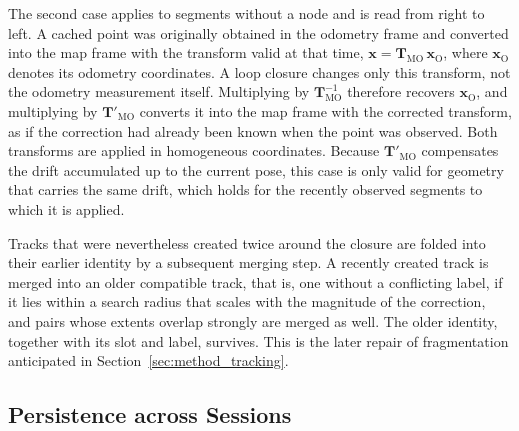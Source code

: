 {The second case applies to segments without a node and is read from right to left. A cached point was originally obtained in the odometry frame and converted into the map frame with the transform valid at that time, $\mathbf{x} = \mathbf{T}_{\mathrm{MO}}\,\mathbf{x}_{\mathrm{O}}$, where $\mathbf{x}_{\mathrm{O}}$ denotes its odometry coordinates. A loop closure changes only this transform, not the odometry measurement itself. Multiplying by $\mathbf{T}_{\mathrm{MO}}^{-1}$ therefore recovers $\mathbf{x}_{\mathrm{O}}$, and multiplying by $\mathbf{T}'_{\mathrm{MO}}$ converts it into the map frame with the corrected transform, as if the correction had already been known when the point was observed. Both transforms are applied in homogeneous coordinates. Because $\mathbf{T}'_{\mathrm{MO}}$ compensates the drift accumulated up to the current pose, this case is only valid for geometry that carries the same drift, which holds for the recently observed segments to which it is applied.

Tracks that were nevertheless created twice around the closure are folded into their earlier identity by a subsequent merging step. A recently created track is merged into an older compatible track, that is, one without a conflicting label, if it lies within a search radius that scales with the magnitude of the correction, and pairs whose extents overlap strongly are merged as well. The older identity, together with its slot and label, survives. This is the later repair of fragmentation anticipated in Section~\ref{sec:method_tracking}.
\par}

\subsection{Persistence across Sessions}
\label{subsec:method_sessions}


